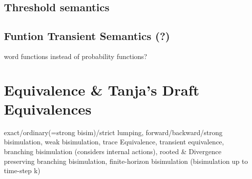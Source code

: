             \begin{definition}
            \end{definition}
                       
        
        \subsection{Threshold semantics}
            
        
        \subsection{Funtion Transient Semantics (?)}
        word functions instead of probability functions?
           
        
        
        
        
        
        
    \section{Equivalence \& Tanja's Draft Equivalences}
        exact/ordinary(=strong bisim)/strict lumping, forward/backward/strong bisimulation, weak bisimulation, trace Equivalence, transient equivalence, branching bisimulation (considers internal actions), rooted \& Divergence preserving branching bisimulation, finite-horizon bisimulation (bisimulation up to time-step k)
        
